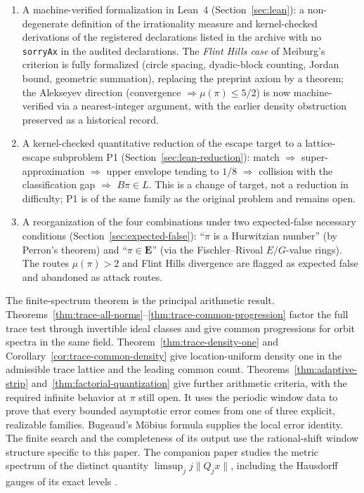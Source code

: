 \documentclass[11pt]{amsart}
\theoremstyle{definition}
\theoremstyle{remark}
\numberwithin{equation}{section}
\newcommand{\irr}{\mu}
\begin{document}
\begin{enumerate}
\item A machine-verified formalization in Lean~4 (Section~\ref{sec:lean}): a non-degenerate definition of the irrationality measure and kernel-checked derivations of the registered declarations listed in the archive with no \texttt{sorryAx} in the audited declarations. The \emph{Flint Hills case} of Meiburg's criterion is fully formalized (circle spacing, dyadic-block counting, Jordan bound, geometric summation), replacing the preprint axiom by a theorem; the Alekseyev direction (convergence $\Rightarrow\irr(\pi)\le5/2$) is now machine-verified via a nearest-integer argument, with the earlier density obstruction preserved as a historical record.
\item A kernel-checked quantitative reduction of the escape target to a lattice-escape subproblem P1 (Section~\ref{sec:lean-reduction}): match $\Rightarrow$ super-approximation $\Rightarrow$ upper envelope tending to $1/8$ $\Rightarrow$ collision with the classification gap $\Rightarrow$ $B\pi\in L$. This is a change of target, not a reduction in difficulty; P1 is of the same family as the original problem and remains open.
\item A reorganization of the four combinations under two expected-false necessary conditions (Section~\ref{sec:expected-false}): ``$\pi$ is a Hurwitzian number'' (by Perron's theorem) and ``$\pi\in\mathbf{E}$'' (via the Fischler--Rivoal $E/G$-value rings). The routes $\irr(\pi)>2$ and Flint Hills divergence are flagged as expected false and abandoned as attack routes.
\end{enumerate}

The finite-spectrum theorem is the principal arithmetic result.
Theorems~\ref{thm:trace-all-norms}--\ref{thm:trace-common-progression}
factor the full trace test through invertible ideal classes and
give common progressions for orbit spectra in the same field.
Theorem~\ref{thm:trace-density-one} and
Corollary~\ref{cor:trace-common-density} give location-uniform density one in
the admissible trace lattice and the leading common count. Theorems~\ref{thm:adaptive-strip}
and~\ref{thm:factorial-quantization} give further arithmetic
criteria, with the required infinite behavior at $\pi$ still open. It uses the
periodic window data to prove that every bounded asymptotic error comes from
one of three explicit, realizable families. Bugeaud's M\"obius formula
\cite[eq.~(3.4)]{BugeaudQuad} supplies the local error identity. The finite
search and the completeness of its output use the rational-shift window
structure specific to this paper. The companion paper studies the metric
spectrum of the distinct quantity $\limsup_j j\|Q_jx\|$, including the
Hausdorff gauges of its exact levels \cite{CompanionGauge}.
\end{document}
